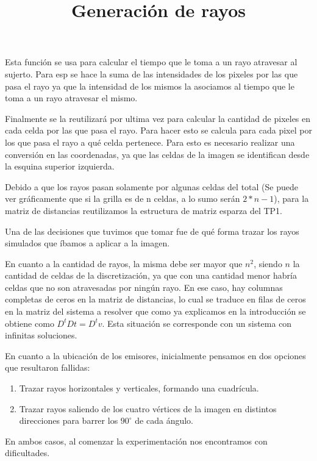 \par Esta función se usa para calcular el tiempo que le toma a un rayo atravesar al sujerto. Para esp se hace la suma de las intensidades de los pixeles por las que pasa el rayo ya que la intensidad de los mismos la asociamos al tiempo que le toma a un rayo atravesar el mismo.

\par Finalmente se la reutilizará por ultima vez para calcular la cantidad de pixeles en cada celda por las que pasa el rayo. Para hacer esto se calcula para cada pixel por los que pasa el rayo a qué celda pertenece. Para esto es necesario realizar una conversión en las coordenadas, ya que las celdas de la imagen se identifican desde la esquina superior izquierda.

\par Debido a que los rayos pasan solamente por algunas celdas del total (Se puede ver gráficamente que si la grilla es de n celdas, a lo sumo serán $2*n-1$), para la matriz de distancias reutilizamos la estructura de matriz esparza del TP1.

\title{Generación de rayos}

\par Una de las decisiones que tuvimos que tomar fue de qué forma trazar los rayos simulados que íbamos a aplicar a la imagen.

\par En cuanto a la cantidad de rayos, la misma debe ser mayor que $n^{2}$, siendo $n$ la cantidad de celdas de la discretización, ya que con una cantidad menor habría celdas que no son atravesadas por ningún rayo. En ese caso, hay columnas completas de ceros en la matriz de distancias, lo cual se traduce en filas de ceros en la matriz del sistema a resolver que como ya explicamos en la introducción se obtiene como $D^{t}D t = D^{t} v$. Esta situación se corresponde con un sistema con infinitas soluciones.

\par En cuanto a la ubicación de los emisores, inicialmente pensamos en dos opciones que resultaron fallidas:
\begin{enumerate}
\item Trazar rayos horizontales y verticales, formando una cuadrícula.
\item Trazar rayos saliendo de los cuatro vértices de la imagen en distintos direcciones para barrer los $90^{\circ}$ de cada ángulo.
\end{enumerate}

\par En ambos casos, al comenzar la experimentación nos encontramos con dificultades.

